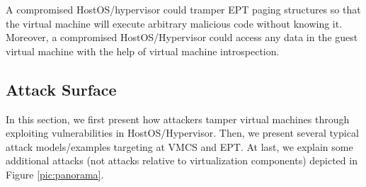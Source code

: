 A compromised HostOS/hypervisor could tramper EPT paging structures so that the virtual machine will execute arbitrary malicious code without knowing it. 
Moreover, a compromised HostOS/Hypervisor could access any data in the guest virtual machine with the help of virtual machine introspection.



\subsection{Attack Surface}\label{sub:attacksurface}

In this section, we first present how attackers tamper virtual machines through exploiting vulnerabilities in HostOS/Hypervisor. Then, we present several typical attack models/examples targeting at VMCS and EPT. At last, we explain some additional attacks (not attacks relative to virtualization components) depicted in Figure \ref{pic:panorama}.

